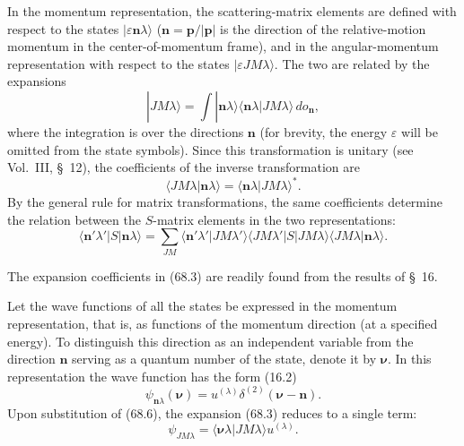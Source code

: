 In the momentum representation, the scattering-matrix elements are defined with respect to the states $|\varepsilon\mathbf n\lambda\rangle$ ($\mathbf n=\mathbf p/|\mathbf p|$ is the direction of the relative-motion momentum in the center-of-momentum frame), and in the angular-momentum representation with respect to the states $|\varepsilon JM\lambda\rangle$. The two are related by the expansions
\begin{equation}
|JM\lambda\rangle=\int|\mathbf n\lambda\rangle
\langle\mathbf n\lambda|JM\lambda\rangle\,do_{\mathbf n},
\tag{68.3}
\end{equation}
where the integration is over the directions $\mathbf n$ (for brevity, the energy $\varepsilon$ will be omitted from the state symbols). Since this transformation is unitary (see Vol.~III, \S~12), the coefficients of the inverse transformation are
\begin{equation}
\langle JM\lambda|\mathbf n\lambda\rangle
=\langle\mathbf n\lambda|JM\lambda\rangle^*.
\tag{68.4}
\end{equation}
By the general rule for matrix transformations, the same coefficients determine the relation between the $S$-matrix elements in the two representations:
\begin{equation}
\langle\mathbf n'\lambda'|S|\mathbf n\lambda\rangle
=\sum_{JM}\langle\mathbf n'\lambda'|JM\lambda'\rangle
\langle JM\lambda'|S|JM\lambda\rangle
\langle JM\lambda|\mathbf n\lambda\rangle.
\tag{68.5}
\end{equation}

The expansion coefficients in (68.3) are readily found from the results of \S~16.

Let the wave functions of all the states be expressed in the momentum representation, that is, as functions of the momentum direction (at a specified energy). To distinguish this direction as an independent variable from the direction $\mathbf n$ serving as a quantum number of the state, denote it by $\boldsymbol\nu$. In this representation the wave function has the form (16.2)
\begin{equation}
\psi_{\mathbf n\lambda}(\boldsymbol\nu)
=u^{(\lambda)}\delta^{(2)}(\boldsymbol\nu-\mathbf n).
\tag{68.6}
\end{equation}
Upon substitution of (68.6), the expansion (68.3) reduces to a single term:
\begin{equation}
\psi_{JM\lambda}=\langle\boldsymbol\nu\lambda|JM\lambda\rangle
u^{(\lambda)}.
\tag{68.7}
\end{equation}

